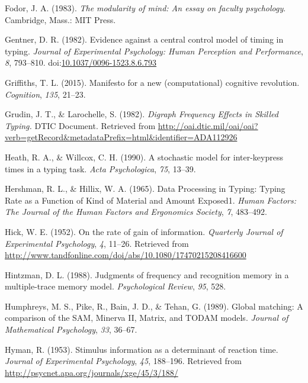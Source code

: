 \documentclass[,man,floatsintext]{apa6}
\begin{document}
\leavevmode\hypertarget{ref-fodor_modularity_1983}{}%
Fodor, J. A. (1983). \emph{The modularity of mind: An essay on faculty psychology}. Cambridge, Mass.: MIT Press.

\leavevmode\hypertarget{ref-GentnerEvidencecentralcontrol1982}{}%
Gentner, D. R. (1982). Evidence against a central control model of timing in typing. \emph{Journal of Experimental Psychology: Human Perception and Performance}, \emph{8}, 793--810. doi:\href{https://doi.org/10.1037/0096-1523.8.6.793}{10.1037/0096-1523.8.6.793}

\leavevmode\hypertarget{ref-griffiths_manifesto_2015}{}%
Griffiths, T. L. (2015). Manifesto for a new (computational) cognitive revolution. \emph{Cognition}, \emph{135}, 21--23.

\leavevmode\hypertarget{ref-grudin_digraph_1982}{}%
Grudin, J. T., \& Larochelle, S. (1982). \emph{Digraph Frequency Effects in Skilled Typing.} DTIC Document. Retrieved from \url{http://oai.dtic.mil/oai/oai?verb=getRecord\&metadataPrefix=html\&identifier=ADA112926}

\leavevmode\hypertarget{ref-heath_stochastic_1990}{}%
Heath, R. A., \& Willcox, C. H. (1990). A stochastic model for inter-keypress times in a typing task. \emph{Acta Psychologica}, \emph{75}, 13--39.

\leavevmode\hypertarget{ref-HershmanDataProcessingTyping1965}{}%
Hershman, R. L., \& Hillix, W. A. (1965). Data Processing in Typing: Typing Rate as a Function of Kind of Material and Amount Exposed1. \emph{Human Factors: The Journal of the Human Factors and Ergonomics Society}, \emph{7}, 483--492.

\leavevmode\hypertarget{ref-hick_rate_1952}{}%
Hick, W. E. (1952). On the rate of gain of information. \emph{Quarterly Journal of Experimental Psychology}, \emph{4}, 11--26. Retrieved from \url{http://www.tandfonline.com/doi/abs/10.1080/17470215208416600}

\leavevmode\hypertarget{ref-hintzman_judgments_1988}{}%
Hintzman, D. L. (1988). Judgments of frequency and recognition memory in a multiple-trace memory model. \emph{Psychological Review}, \emph{95}, 528.

\leavevmode\hypertarget{ref-humphreys_global_1989}{}%
Humphreys, M. S., Pike, R., Bain, J. D., \& Tehan, G. (1989). Global matching: A comparison of the SAM, Minerva II, Matrix, and TODAM models. \emph{Journal of Mathematical Psychology}, \emph{33}, 36--67.

\leavevmode\hypertarget{ref-hyman_stimulus_1953}{}%
Hyman, R. (1953). Stimulus information as a determinant of reaction time. \emph{Journal of Experimental Psychology}, \emph{45}, 188--196. Retrieved from \url{http://psycnet.apa.org/journals/xge/45/3/188/}
\end{document}
